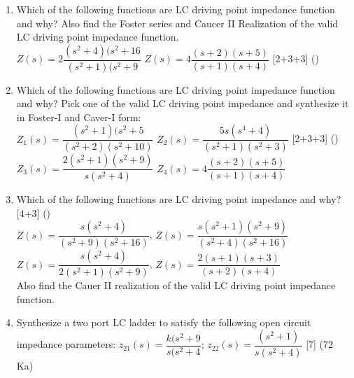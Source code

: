 \documentclass[12pt]{article}
\begin{document}
\begin{enumerate}
	\item Which of the following functions are LC driving point impedance function and why? Also find the Foster series and Caucer II Realization of the valid LC driving point impedance function.\\
	$Z(s) = 2\dfrac{(s^2+4)(s^2+16}{(s^2+1)(s^2+9}$ \hspace{2cm}
	$Z(s) = 4\dfrac{(s+2)(s+5)}{(s+1)(s+4)}$ \hfill [2+3+3] ()
	
	\item Which of the following functions are LC driving point impedance function and why? Pick one of the valid LC driving point impedance and synthesize it in Foster-I and Caver-I form:\\
	$Z_1(s) = \dfrac{(s^2+1)(s^2+5}{(s^2+2)(s^2+10)}$ \hspace{2cm}
	$Z_2(s) = \dfrac{5s(s^4+4)}{(s^2+1)(s^2+3)}$ \hfill [2+3+3] ()\\
	$Z_3(s) = \dfrac{2(s^2+1)(s^2+9)}{s(s^2+4)}$ \hspace{2cm}
	$Z_4(s) = 4\dfrac{(s+2)(s+5)}{(s+1)(s+4)}$
	
	\item Which of the following functions are LC driving point impedance and why? \hfill [4+3] ()\\
	$Z(s) = \dfrac{s(s^2+4)}{(s^2+9)(s^2+16)}$, \hspace{2cm}
	$Z(s) = \dfrac{s(s^2+1)(s^2+9)}{(s^2+4)(s^2+16)}$ \\
	$Z(s) = \dfrac{s(s^2+4)}{2(s^2+1)(s^2+9)}$, \hspace{2cm}
	$Z(s) = \dfrac{2(s+1)(s+3)}{(s+2)(s+4)}$\\
	Also find the Cauer II realization of the valid LC driving point impedance function.
	
	\item Synthesize a two port LC ladder to satisfy the following open circuit impedance parameters: $z_{21}(s) = \dfrac{k(s^2+9}{s(s^2+4}$; $z_{22}(s) = \dfrac{(s^2+1)}{s(s^2+4)}$ \hfill [7] (72 Ka)
\end{enumerate}
\end{document}
